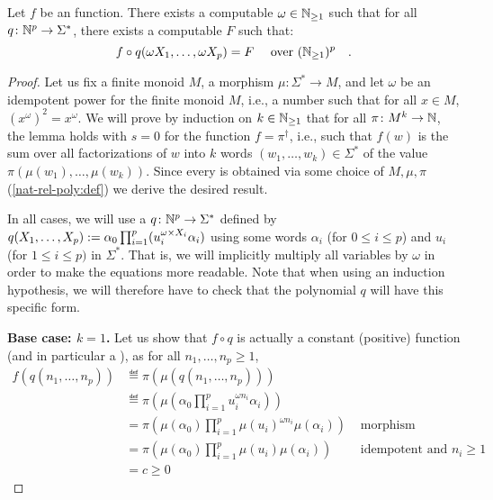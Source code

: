 \begin{lemma}
	\label{n-poly-combinatorics:lem}
	Let $f$ be an  function.
	There exists a computable $\omega \in \mathbb{N}_{\geq 1}$
	such that for all 
	$q \colon \mathbb{N}^p \to \Sigma^*$,
	there exists a computable  $F$
	such that:
	\begin{equation*}
		f \circ q(\omega X_1, \dots, \omega X_p)
		=
		F
		\quad
		\text{ over } (\mathbb{N}_{\geq 1})^p
		\quad .
	\end{equation*}
\end{lemma}
\begin{proof}
	Let us fix a finite monoid $M$, a morphism $\mu \colon \Sigma^* \to M$, and
	let $\omega$ be an idempotent power for the finite monoid $M$,
	i.e., a number such that for all $x \in M$,
	$(x^{\omega})^2 = x^{\omega}$.
	We will prove by induction on $k \in \mathbb{N}_{\geq 1}$
	that for all
	$\pi \colon M^k \to \mathbb{N}$,
	the lemma holds with $s = 0$ for the function
	$f = \pi^\dagger$, i.e., such that
	$f(w)$ is the sum over all factorizations of $w$
	into $k$ words $(w_1, \dots, w_k) \in \Sigma^*$
	of the value $\pi(\mu(w_1), \dots, \mu(w_k))$.
	Since every 
	is obtained via some choice of $M, \mu, \pi$ (\cref{nat-rel-poly:def})
	we derive the desired result.

	In all cases, we will use a  $q \colon \mathbb{N}^p \to
		\Sigma^*$ defined by $q(X_1, \dots, X_p) \mathrel{:=} \alpha_0 \prod_{i = 1}^p
		(u_i^{\omega \times X_i} \alpha_i)$ using some words $\alpha_i$ (for $0 \leq i
		\leq p$) and $u_i$ (for $1 \leq i \leq p)$ in $\Sigma^*$. That is, we will
	implicitly multiply all variables by $\omega$ in order to make the
	equations more readable. Note that when using an induction hypothesis, we
	will therefore have to check that the polynomial $q$ will have this
	specific form.

	\textbf{Base case: $k = 1$.}
	Let us show that $f \circ q$ is
	actually a constant (positive) function (and in particular a ), as for
	all $n_1, \dots, n_p \geq 1$,
	\begin{align*}
		f(q(n_1, \dots, n_p))
		 & \eqdef \pi\left(\mu(q(n_1, \dots, n_p))\right)                                      \\
		 & \eqdef \pi\left(\mu(\alpha_0 \prod_{i = 1}^p u_i^{\omega n_i} \alpha_i)\right)
		\\
		 & = \pi\left(\mu(\alpha_0) \prod_{i = 1}^p \mu(u_i)^{\omega n_i} \mu(\alpha_i)\right)
		 & \text{ morphism }
		\\
		 & = \pi\left(\mu(\alpha_0) \prod_{i = 1}^p \mu(u_i) \mu(\alpha_i)\right)
		 & \text{ idempotent and } n_i \geq 1                                                  \\
		 & = c \geq 0
	\end{align*}


\end{proof}
